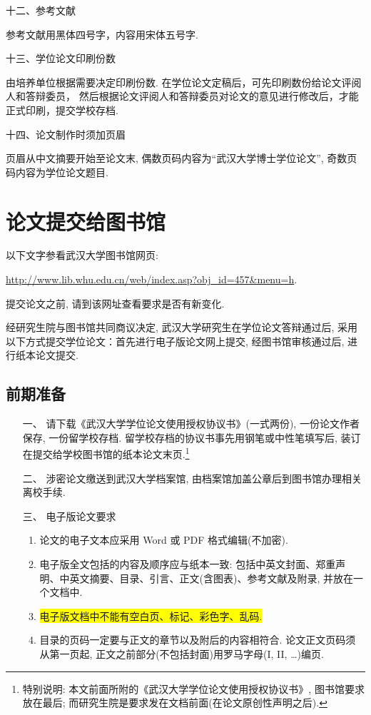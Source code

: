 \documentclass{ice_report}  %
\begin{document}
{\heiti 十二、参考文献}

参考文献用黑体四号字，内容用宋体五号字.

{\heiti 十三、学位论文印刷份数}

由培养单位根据需要决定印刷份数. 在学位论文定稿后，可先印刷数份给论文评阅人和答辩委员，
然后根据论文评阅人和答辩委员对论文的意见进行修改后，才能正式印刷，提交学校存档.

{\heiti 十四、论文制作时须加页眉}


页眉从中文摘要开始至论文末, 偶数页码内容为``武汉大学博士学位论文'', 奇数页码内容为学位论文题目.


\chapter{论文提交给图书馆}

{\kaishu 以下文字参看武汉大学图书馆网页:
 \begin{center}
 \url{http://www.lib.whu.edu.cn/web/index.asp?obj_id=457&menu=h}.
 \end{center}
 提交论文之前, 请到该网址查看要求是否有新变化.
}

    经研究生院与图书馆共同商议决定, 武汉大学研究生在学位论文答辩通过后,
    采用以下方式提交学位论文：首先进行电子版论文网上提交, 经图书馆审核通过后, 进行纸本论文提交.

\section*{前期准备}
\begin{itemize}
  \item[一、] 请下载《武汉大学学位论文使用授权协议书》(一式两份), 一份论文作者保存, 一份留学校存档.
    留学校存档的协议书事先用钢笔或中性笔填写后,  装订在提交给学校图书馆的纸本论文末页.\footnote{\heiti 特别说明:
    本文前面所附的《武汉大学学位论文使用授权协议书》, 图书馆要求放在最后;
    而研究生院是要求发在文档前面(在论文原创性声明之后). }

    \item[二、]涉密论文缴送到武汉大学档案馆, 由档案馆加盖公章后到图书馆办理相关离校手续.

    \item[三、]电子版论文要求
\begin{enumerate}[1.]
  \item 论文的电子文本应采用 Word 或 PDF 格式编辑(不加密).
  \item 电子版全文包括的内容及顺序应与纸本一致: 包括中英文封面、郑重声明、中英文摘要、目录、引言、正文(含图表)、参考文献及附录, 并放在一个文档中.
  \item \colorbox{yellow}{电子版文档中不能有空白页、标记、彩色字、乱码.}
  \item 目录的页码一定要与正文的章节以及附后的内容相符合. 论文正文页码须从第一页起, 正文之前部分(不包括封面)用罗马字母(I, II, \dots)编页.
\end{enumerate}
\end{itemize}
\end{document}
